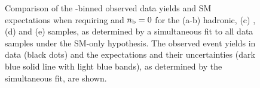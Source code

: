 \begin{figure}[t!]
\begin{center}
{    } 
    \caption{\label{fig:best-fit-ge4j0b} Comparison of the
      \scalht-binned observed data yields and SM expectations when
      requiring \njethigh and $n_{\text{b}} = 0$ for the (a-b) hadronic, (c)
      \mj, (d) \mmj and (e) \gj samples, as determined by a
      simultaneous fit to all data samples under the SM-only
      hypothesis. The observed event yields in data (black dots) and
      the expectations and their uncertainties (dark blue solid line
      with light blue bands), as determined by the simultaneous fit,
      are shown. 
      }
  \end{center}
\end{figure}

